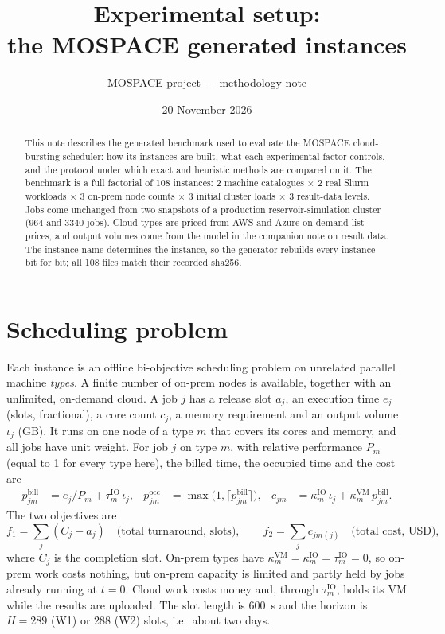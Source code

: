 \documentclass[11pt,a4paper]{article}
\title{Experimental setup:\\the MOSPACE generated instances}
\author{MOSPACE project --- methodology note}
\date{20 November 2026}
\newcommand{\ioVol}{\iota_j}
\newcommand{\tauIO}{\tau^{\mathrm{IO}}}
\newcommand{\kapIO}{\kappa^{\mathrm{IO}}}
\newcommand{\kapVM}{\kappa^{\mathrm{VM}}}
\begin{document}
\maketitle

\begin{abstract}
This note describes the generated benchmark used to evaluate the MOSPACE
cloud-bursting scheduler: how its instances are built, what each experimental
factor controls, and the protocol under which exact and heuristic methods are
compared on it. The benchmark is a full factorial of 108 instances: 2 machine
catalogues $\times$ 2 real Slurm workloads $\times$ 3 on-prem node counts
$\times$ 3 initial cluster loads $\times$ 3 result-data levels. Jobs come
unchanged from two snapshots of a production reservoir-simulation cluster (964 and
\num{3340} jobs). Cloud types are priced from AWS and Azure on-demand list prices,
and output volumes come from the model in the companion note on result data. The
instance name determines the instance, so the generator rebuilds every instance
bit for bit; all 108 files match their recorded sha256.
\end{abstract}

\section{Scheduling problem}\label{sec:problem}
Each instance is an offline bi-objective scheduling problem on unrelated parallel
machine \emph{types}. A finite number of on-prem nodes is available, together with
an unlimited, on-demand cloud. A job $j$ has a release slot $a_j$, an execution
time $e_j$ (slots, fractional), a core count $c_j$, a memory requirement and an
output volume $\ioVol$ (GB). It runs on one node of a type $m$ that covers its
cores and memory, and all jobs have unit weight. For job $j$ on type $m$, with
relative performance $P_m$ (equal to 1 for every type here), the billed time, the
occupied time and the cost are
\begin{align}
  p^{\mathrm{bill}}_{jm} &= e_j / P_m + \tauIO_m\,\ioVol, &
  p^{\mathrm{occ}}_{jm}  &= \max\bigl(1, \lceil p^{\mathrm{bill}}_{jm}\rceil\bigr), &
  c_{jm} &= \kapIO_m\,\ioVol + \kapVM_m\,p^{\mathrm{bill}}_{jm}.
\end{align}
The two objectives are
\begin{equation}
  f_1 = \sum_j (C_j - a_j) \quad\text{(total turnaround, slots)}, \qquad
  f_2 = \sum_j c_{j m(j)} \quad\text{(total cost, USD)},
\end{equation}
where $C_j$ is the completion slot. On-prem types have
$\kapVM_m=\kapIO_m=\tauIO_m=0$, so on-prem work costs nothing, but on-prem
capacity is limited and partly held by jobs already running at $t=0$. Cloud
work costs money and, through $\tauIO_m$, holds its VM while the results are
uploaded. The slot length is \SI{600}{s} and the horizon is $H=289$
(W1) or 288 (W2) slots, i.e.\ about two days.
\end{document}
